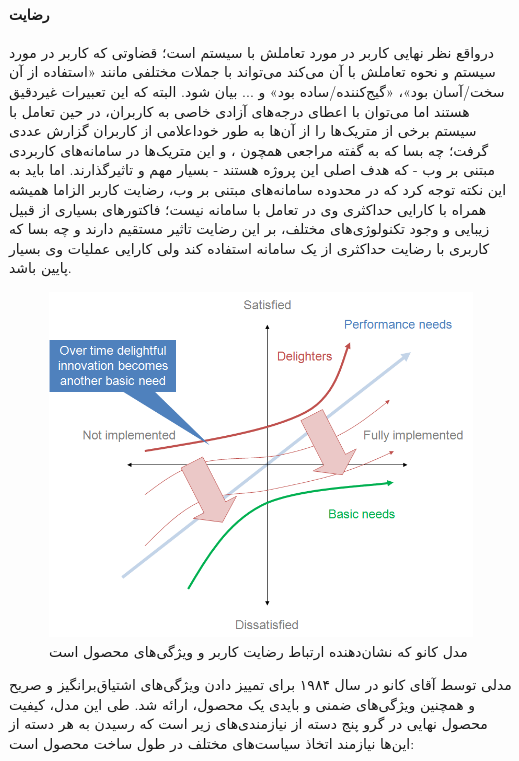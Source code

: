 \paragraph{رضایت}
درواقع نظر نهایی کاربر در مورد تعاملش با سیستم است؛ قضاوتی که کاربر در مورد سیستم و نحوه تعاملش با آن می‌کند می‌تواند با جملات مختلفی مانند «استفاده از آن سخت/آسان بود»، «گیج‌کننده/ساده بود» و ... بیان شود. البته که این تعبیرات غیردقیق هستند اما می‌توان با اعطای درجه‌های آزادی خاصی به کاربران، در حین تعامل با سیستم برخی از متریک‌ها را از آن‌ها به طور خوداعلامی از کاربران گزارش عددی گرفت؛ چه بسا که به گفته مراجعی همچون
\cite{albert_measuring_2013}،
\cite{alonso-rios_usability:_2009} و
\cite{seffah_usability_2006}
این متریک‌ها در سامانه‌های کاربردی مبتنی بر وب - که هدف اصلی این پروژه هستند - بسیار مهم و تاثیرگذارند. اما باید به این نکته توجه کرد که در محدوده سامانه‌های مبتنی بر وب، رضایت کاربر الزاما همیشه همراه با کارایی حداکثری وی در تعامل با سامانه نیست؛ فاکتورهای بسیاری از قبیل زیبایی و وجود تکنولوژی‌های مختلف، بر این رضایت تاثیر مستقیم دارند و چه بسا که کاربری با رضایت حداکثری از یک سامانه استفاده کند ولی کارایی عملیات وی بسیار پایین باشد.
\begin{figure}[H]
	\centering\includegraphics[width=13cm]{Resources/kano_model.PNG}
	\caption{مدل کانو که نشان‌دهنده ارتباط رضایت کاربر و ویژگی‌های محصول است
		\cite{noauthor_kano_2018}
	}
	\label{fig:kano}
\end{figure}
مدلی توسط آقای کانو در سال ۱۹۸۴
\cite{kano_attractive_1984}
برای تمییز دادن ویژگی‌های اشتیاق‌برانگیز و صریح و همچنین ویژگی‌های ضمنی و بایدی یک محصول، ارائه شد. طی این مدل، کیفیت محصول نهایی در گرو پنج دسته از نیازمندی‌های زیر است که رسیدن به هر دسته از این‌ها نیازمند اتخاذ سیاست‌های مختلف در طول ساخت محصول است:
